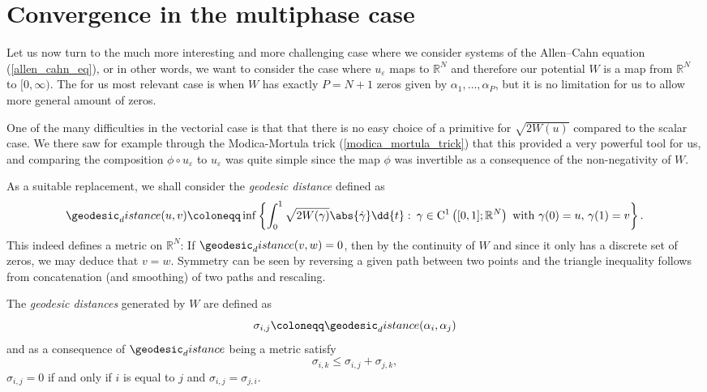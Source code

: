 \section{Convergence in the multiphase case}

Let us now turn to the much more interesting and more challenging case where we consider systems of the Allen--Cahn equation (\ref{allen_cahn_eq}), or in other words, we want to consider the case where $ u_{\varepsilon } $ maps to $ \mathbb{ R }^{ N } $ and therefore our potential $ W $ is a map from $ \mathbb{ R }^{ N } $ to $ [ 0 , \infty ) $. The for us most relevant case is when $ W $ has exactly $ P = N + 1 $ zeros given by $ \alpha_{ 1 } , \dotsc, \alpha_{ P } $, but it is no limitation for us to allow more general amount of zeros.

One of the many difficulties in the vectorial case is that that there is no easy choice of a primitive for $ \sqrt{ 2 W ( u ) } $ compared to the scalar case. We there saw for example through the Modica-Mortula trick (\ref{modica_mortula_trick}) that this provided a very powerful tool for us, and comparing the composition $ \phi \circ u_{ \varepsilon } $ to $ u_{ \varepsilon } $ was quite simple since the map $ \phi $ was invertible as a consequence of the non-negativity of $ W $.

As a suitable replacement, we shall consider the \emph{geodesic distance} defined as 
\begin{equation*}
		\geodesic_distance ( u, v )
		\coloneqq
		\inf
		\left\{
		\int_{ 0 }^{ 1 }
		\sqrt{ 2 W ( \gamma ) }
		\abs{ \dot{ \gamma }  }
		\dd{t}
		\,
		\colon
		\, \gamma \in \mathrm{ C }^{ 1 } \left( [0, 1 ] ; \mathbb{ R }^{ N } \right) \text{ with } \gamma( 0 ) = u,\, \gamma( 1 )= v 
		\right\}.
\end{equation*}
This indeed defines a metric on $ \mathbb{ R }^{ N } $: If $ \geodesic_distance ( v, w ) = 0 $, then by the continuity of $ W $ and since it only has a discrete set of zeros, we may deduce that $ v = w $. Symmetry can be seen by reversing a given path between two points and the triangle inequality follows from concatenation (and smoothing) of two paths and rescaling.

The \emph{geodesic distances} generated by $ W $  are defined as
\begin{equation*}
	\sigma_{ i , j } 
	\coloneqq
	\geodesic_distance ( \alpha_{ i } , \alpha_{ j } )
\end{equation*}
and as a consequence of $ \geodesic_distance $ being a metric satisfy
\begin{equation*}
	\sigma_{ i , k } \leq \sigma_{ i , j } + \sigma_{ j , k },
\end{equation*}
$ \sigma_{ i , j } = 0 $ if and only if $ i $ is equal to $ j $ and $ \sigma_{ i , j } = \sigma_{ j, i } $.
